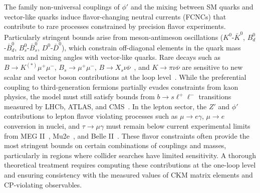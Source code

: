 The family non-universal couplings of $\phi'$ and the mixing between SM quarks and vector-like quarks induce flavor-changing neutral currents (FCNCs) that contribute to rare processes constrained by precision flavor experiments. Particularly stringent bounds arise from meson-antimeson oscillations ($K^0$-$\bar{K}^0$, $B^0_d$-$\bar{B}^0_d$, $B^0_s$-$\bar{B}^0_s$, $D^0$-$\bar{D}^0$), which constrain off-diagonal elements in the quark mass matrix and mixing angles with vector-like quarks. Rare decays such as $B \to K^{(*)} \mu^+ \mu^-$, $B_s \to \mu^+ \mu^-$, $B \to X_s \nu\bar{\nu}$~\cite{Belle-II:2025bho}, and $K \to \pi \nu \bar{\nu}$ are sensitive to new scalar and vector boson contributions at the loop level~\cite{Dutta2022}. While the preferential coupling to third-generation fermions partially evades constraints from kaon physics, the model must still satisfy bounds from $b \to s \ell^+ \ell^-$ transitions measured by LHCb, ATLAS, and CMS~\cite{LHCb:2021trn}. In the lepton sector, the $Z'$ and $\phi'$ contributions to lepton flavor violating processes such as $\mu \to e \gamma$, $\mu \to e$ conversion in nuclei, and $\tau \to \mu \gamma$ must remain below current experimental limits from MEG II~\cite{MEGII:2025gzr}, Mu2e~\cite{Ganguly:2022ufq}, and Belle II~\cite{Belle-II:2018jsg}. These flavor constraints often provide the most stringent bounds on certain combinations of couplings and masses, particularly in regions where collider searches have limited sensitivity. A thorough theoretical treatment requires computing these contributions at the one-loop level and ensuring consistency with the measured values of CKM matrix elements and CP-violating observables.


